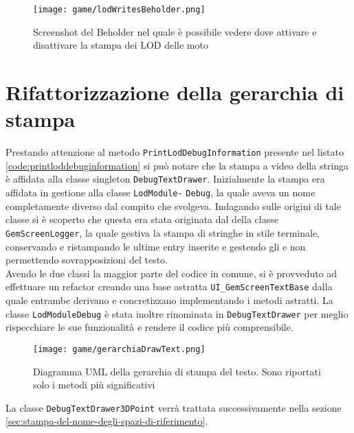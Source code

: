 \begin{figure}[h!] 
	\centering 
	\hspace*{-0.05\columnwidth}\texttt{[image: game/lodWritesBeholder.png]} 
	\caption{Screenshot del Beholder nel quale è possibile vedere dove attivare e disattivare la stampa dei LOD delle moto}
\end{figure}


\section{Rifattorizzazione della gerarchia di stampa}

Prestando attenzione al metodo \texttt{PrintLodDebugInformation} presente nel listato \ref{code:printloddebuginformation} si può notare che la stampa a video della stringa è affidata alla classe singleton \texttt{DebugTextDrawer}. Inizialmente la stampa era affidata in gestione alla classe \texttt{LodModule-} \texttt{Debug}, la quale aveva un nome completamente diverso dal compito che svolgeva. Indagando sulle origini di tale classe si è scoperto che questa era stata originata dal  della classe \texttt{GemScreenLogger}, la quale gestiva la stampa di stringhe in stile terminale, conservando e ristampando le ultime entry inserite e gestendo gli  e non permettendo sovrapposizioni del testo.\\

Avendo le due classi la maggior parte del codice in comune, si è provveduto ad effettuare un refactor creando una base astratta \texttt{UI\_GemScreenTextBase} dalla quale entrambe derivano e concretizzano implementando i metodi astratti. La classe \texttt{LodModuleDebug} è stata inoltre rinominata in \texttt{DebugTextDrawer} per meglio rispecchiare le sue funzionalità e rendere il codice più comprensibile.\\

\begin{figure}[h!] 
	\centering 
	\texttt{[image: game/gerarchiaDrawText.png]} 
	\caption{Diagramma UML della gerarchia di stampa del testo. Sono riportati solo i metodi più significativi}
\end{figure}

La classe \texttt{DebugTextDrawer3DPoint} verrà trattata successivamente nella sezione \ref{sec:stampa-del-nome-degli-spazi-di-riferimento}.\\

